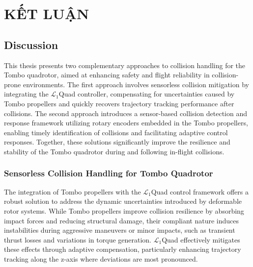 \chapter{KẾT LUẬN}\label{cha:conclusion} \label{chap:conclusion}

\section{Discussion}

This thesis presents two complementary approaches to collision handling for the Tombo quadrotor, aimed at enhancing safety and flight reliability in collision-prone environments. The first approach involves sensorless collision mitigation by integrating the $\mathcal{L}_1$Quad controller, compensating for uncertainties caused by Tombo propellers and quickly recovers trajectory tracking performance after collisions. The second approach introduces a sensor-based collision detection and response framework utilizing rotary encoders embedded in the Tombo propellers, enabling timely identification of collisions and facilitating adaptive control responses. Together, these solutions significantly improve the resilience and stability of the Tombo quadrotor during and following in-flight collisions.

\subsection{Sensorless Collision Handling for Tombo Quadrotor}

The integration of Tombo propellers with the $\mathcal{L}_1$Quad control framework offers a robust solution to address the dynamic uncertainties introduced by deformable rotor systems. While Tombo propellers improve collision resilience by absorbing impact forces and reducing structural damage, their compliant nature induces instabilities during aggressive maneuvers or minor impacts, such as transient thrust losses and variations in torque generation. $\mathcal{L}_1$Quad effectively mitigates these effects through adaptive compensation, particularly enhancing trajectory tracking along the z-axis where deviations are most pronounced.